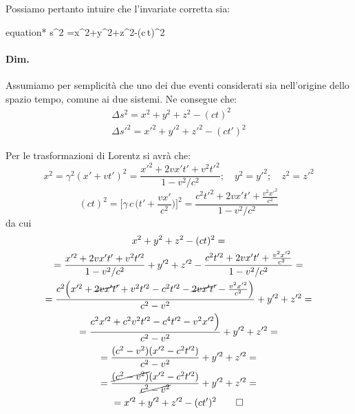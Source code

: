 \documentclass[a4paper, oneside]{article}
\newcommand*\mygraybox[0]{%
		\tcbhighmath}
\newcommand{\equazione}[1]{	\begin{empheq}[box=\mygraybox]{equation*}
			#1
		\end{empheq}}
\newcounter{i}%
\newcounter{n}%
\begin{document}
Possiamo pertanto intuire che l'invariate corretta sia:
\equazione{\Delta s^2 =\Delta  x^2+\Delta y^2+\Delta z^2-(c\,\Delta  t)^2}

\paragraph{Dim.} Assumiamo per semplicità che uno dei due eventi considerati sia nell'origine dello spazio tempo, comune ai due sistemi. Ne consegue che:
\begin{gather*}
\Delta s^2 =x^2+ y^2+z^2-(ct)^2\\
\Delta s'^2 =x'^2+ y'^2+z'^2-(ct')^2
\end{gather*}

Per le trasformazioni di Lorentz si avrà che:
\[
x^2=\gamma^2(x'+vt')^2=\frac{x'^2+2vx't'+v^2t'^2}{1-v^2/c^2};\quad y^2 = y'^2;\quad z^2=z'^2
\]
\[
(ct)^2=\Big[\gamma\, c\,\Big(t'+\frac{vx'}{c^2}\Big)\Big]^2=\frac{c^2t'^2+2vx't'+\frac{v^2x'^2}{c^2}}{1-v^2/c^2}
\]
da cui
\begin{multline*}
x^2+ y^2+z^2-(ct)^2 = \\
= \frac{x'^2+2vx't'+v^2t'^2}{1-v^2/c^2} + y'^2 + z'^2 - \frac{c^2t'^2+2vx't'+\frac{v^2x'^2}{c^2}}{1-v^2/c^2} = \\
= \frac{c^2\Big(x'^2+\cancel{2vx't'}+v^2t'^2-c^2t'^2-\cancel{2vx't'}-\frac{v^2x'^2}{c^2}\Big)}{c^2-v^2} + y'^2 + z'^2 = \\
= \frac{c^2x'^2+c^2v^2t'^2-c^4t'^2-v^2x'^2\Big)}{c^2-v^2} + y'^2 + z'^2 = \\
= \frac{(c^2-v^2)(x'^2-c^2t'^2)}{c^2-v^2}+ y'^2 + z'^2 = \\
= \frac{\cancel{(c^2-v^2)}(x'^2-c^2t'^2)}{\cancel{c^2-v^2}}+ y'^2 + z'^2 = \\
= x'^2+ y'^2+z'^2-(ct')^2 \qed
\end{multline*}
\end{document}
